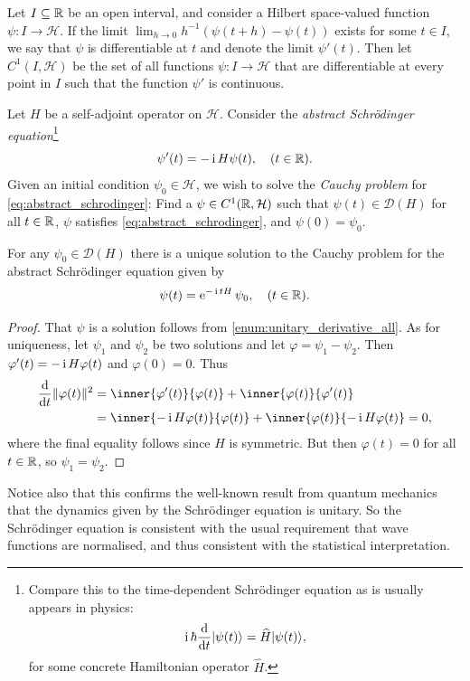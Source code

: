 \documentclass[article, a4paper, 11pt, oneside]{memoir}
\makeatletter
\let\phi\varphi
\numberwithin{equation}{chapter}
\newcommand{\calH}{\mathcal{H}}
\newcommand{\dom}{\mathcal{D}}
\theoremstyle{myexample}
\theoremstyle{myexample}
\theoremstyle{myexamplebreak}
\theoremstyle{myexamplebreak}
\theoremstyle{nonumberplain}
\newtheorem{proof}{\protect\@proof}
\theoremstyle{MyNonumberplain}
\newcommand{\@proof}{}
\renewcommand{\@proof}{Proof}%
\renewcommand{\@proof}{Bevis}%
\makeatother
\begin{document}
\DeclarePairedDelimiter{\ket}{\lvert}{\rangle}

Let $I \subseteq \mathbb{R}$ be an open interval, and consider a Hilbert space-valued function $\psi \colon I \to \calH$. If the limit $\lim_{h \to 0} h^{-1} (\psi(t+h) - \psi(t))$ exists for some $t \in I$, we say that $\psi$ is differentiable at $t$ and denote the limit $\psi'(t)$. Then let $C^1(I, \calH)$ be the set of all functions $\psi \colon I \to \calH$ that are differentiable at every point in $I$ such that the function $\psi'$ is continuous.

Let $H$ be a self-adjoint operator on $\calH$. Consider the \emph{abstract Schrödinger equation}\footnote{Compare this to the time-dependent Schrödinger equation as is usually appears in physics:
%
\begin{equation*}
    \iu \hbar \frac{\dif}{\dif t} \ket{\psi(t)} = \widehat H \ket{\psi(t)},
\end{equation*}
%
for some concrete Hamiltonian operator $\widehat H$.}
%
\begin{equation}
    \label{eq:abstract_schrodinger}
    \psi'(t) = - \operatorname{i} H\psi(t),
    \quad (t \in \mathbb{R}).
\end{equation}
%
Given an initial condition $\psi_0 \in \calH$, we wish to solve the \emph{Cauchy problem} for \eqref{eq:abstract_schrodinger}: Find a $\psi \in C^1(\setR, \calH)$ such that $\psi(t) \in \dom(H)$ for all $t \in \mathbb{R}$, $\psi$ satisfies \eqref{eq:abstract_schrodinger}, and $\psi(0) = \psi_0$.

\begin{proposition}
    \label{thm:abstract_schrodinger}
    For any $\psi_0 \in \dom(H)$ there is a unique solution to the Cauchy problem for the abstract Schrödinger equation given by
    \begin{equation*}
        \psi(t) = \operatorname{\mathrm{e}}^{-\operatorname{i} tH} \psi_0,
        \quad (t \in \mathbb{R}).
    \end{equation*}
\end{proposition}

\begin{proof}
    That $\psi$ is a solution follows from \cref{enum:unitary_derivative_all}. As for uniqueness, let $\psi_1$ and $\psi_2$ be two solutions and let $\phi = \psi_1 - \psi_2$. Then $\phi'(t) = - \iu H\phi(t)$ and $\phi(0) = 0$. Thus
    \begin{align*}
        \frac{\dif}{\dif t} \norm{\phi(t)}^2
            &= \inner{\phi'(t)}{\phi(t)} + \inner{\phi(t)}{\phi'(t)} \\
            &= \inner{-\iu H \phi(t)}{\phi(t)} + \inner{\phi(t)}{-\iu H \phi(t)}
             = 0,
    \end{align*}
    where the final equality follows since $H$ is symmetric. But then $\phi(t) = 0$ for all $t \in \mathbb{R}$, so $\psi_1 = \psi_2$.
\end{proof}
%
Notice also that this confirms the well-known result from quantum mechanics that the dynamics given by the Schrödinger equation is unitary. So the Schrödinger equation is consistent with the usual requirement that wave functions are normalised, and thus consistent with the statistical interpretation.
\end{document}
